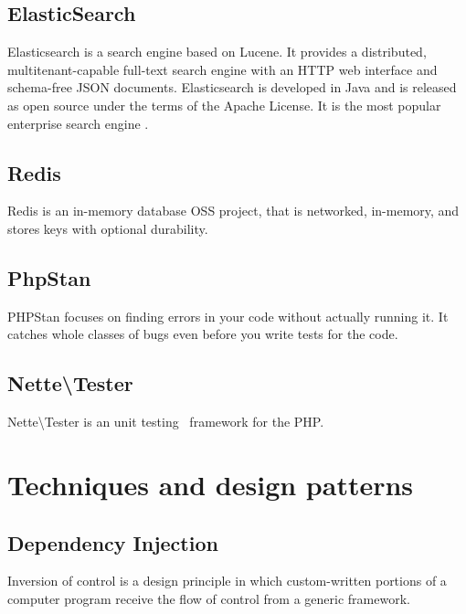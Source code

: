 \subsection{ElasticSearch} \label{sec:theory:elasticsearch}

Elasticsearch is a search engine based on Lucene. It provides a distributed, multitenant-capable full-text search engine with an HTTP web interface and schema-free JSON documents. Elasticsearch is developed in Java and is released as open source under the terms of the Apache License. It is the most popular enterprise search engine .~\cite{wiki:elasticsearch}

\subsection{Redis} \label{sec:theory:redis}

Redis is an in-memory database OSS project, that is networked, in-memory, and stores keys with optional durability.~\cite{wiki:redis}

\subsection{PhpStan} \label{sec:theory:phpstan}

PHPStan focuses on finding errors in your code without actually running it. It catches whole classes of bugs even before you write tests for the code.~\cite{github:phpstan}

\subsection{Nette\textbackslash{}Tester} \label{sec:theory:nette-tester}

Nette\textbackslash{}Tester is an unit testing~\cite{wiki:unit-testing} framework for the PHP.~\cite{tester:docs}

\section{Techniques and design patterns}

\subsection{Dependency Injection} \label{sec:theory:di}

Inversion of control is a design principle in which custom-written portions of a computer program receive the flow of control from a generic framework.


